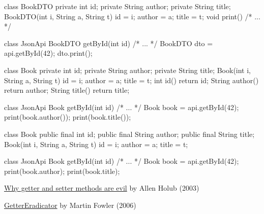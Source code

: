 \documentclass{article}
\begin{document}
\begin{pptWide}{2}
{\small\begin{ffcode}
class BookDTO {
  private int id;
  private String author;
  private String title;
  BookDTO(int i, String a, String t)
    { id = i; author = a; title = t; }
  void print() { /* ... */ }
}
\end{ffcode}
}
\par\columnbreak\par
{\small\begin{ffcode}
class JsonApi {
  BookDTO getById(int id) { /* ... */ }
}
BookDTO dto = api.getById(42);
dto.print();
\end{ffcode}
}
\end{pptWide}
\par
\plush{}

\begin{pptWide}{2}
{\small\begin{ffcode}
class Book {
  private int id;
  private String author;
  private String title;
  Book(int i, String a, String t)
    { id = i; author = a; title = t; }
  int id() { return id; }
  String author() { return author; }
  String title() { return title; }
}
\end{ffcode}
}
\par\columnbreak\par
{\small\begin{ffcode}
class JsonApi {
  Book getById(int id) { /* ... */ }
}
Book book = api.getById(42);
print(book.author());
print(book.title());
\end{ffcode}
}
\end{pptWide}
\par
\plush{}

\begin{pptWide}{2}
{\small\begin{ffcode}
class Book {
  public final int id;
  public final String author;
  public final String title;
  Book(int i, String a, String t)
    { id = i; author = a; title = t; }
}
\end{ffcode}
}
\par\columnbreak\par
{\small\begin{ffcode}
class JsonApi {
  Book getById(int id) { /* ... */ }
}
Book book = api.getById(42);
print(book.author);
print(book.title);
\end{ffcode}
}
\end{pptWide}
\par
\plush{}


\href{https://www.infoworld.com/article/2073723/why-getter-and-setter-methods-are-evil.html}{Why getter and setter methods are evil} by Allen Holub (2003)

\href{https://martinfowler.com/bliki/GetterEradicator.html}{GetterEradicator} by Martin Fowler (2006)
\end{document}
